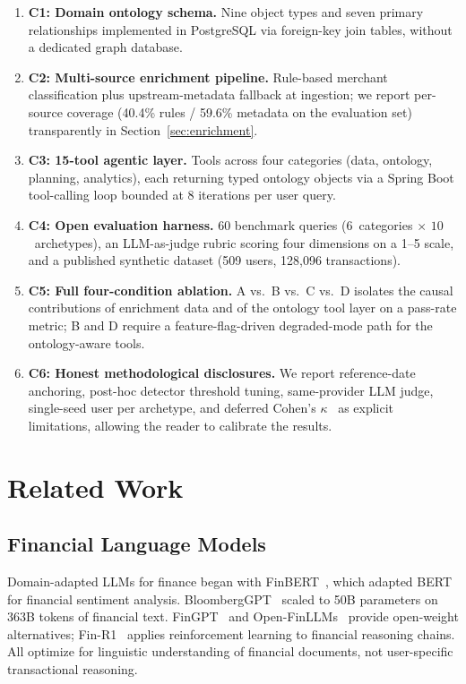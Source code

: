 \documentclass[conference]{IEEEtran}
\begin{document}
\begin{enumerate}
  \item \textbf{C1: Domain ontology schema.} Nine object types and
    seven primary relationships implemented in PostgreSQL via
    foreign-key join tables, without a dedicated graph database.
  \item \textbf{C2: Multi-source enrichment pipeline.} Rule-based
    merchant classification plus upstream-metadata fallback at
    ingestion; we report per-source coverage (40.4\% rules / 59.6\%
    metadata on the evaluation set) transparently in
    Section~\ref{sec:enrichment}.
  \item \textbf{C3: 15-tool agentic layer.} Tools across four
    categories (data, ontology, planning, analytics), each
    returning typed ontology objects via a Spring Boot tool-calling
    loop bounded at 8 iterations per user query.
  \item \textbf{C4: Open evaluation harness.} 60 benchmark queries
    ($6$~categories $\times$ $10$~archetypes), an LLM-as-judge
    rubric scoring four dimensions on a 1--5 scale, and a published
    synthetic dataset (509 users, 128{,}096 transactions).
  \item \textbf{C5: Full four-condition ablation.} A vs.\ B vs.\ C
    vs.\ D isolates the causal contributions of enrichment data and
    of the ontology tool layer on a pass-rate metric; B and D
    require a feature-flag-driven degraded-mode path for the
    ontology-aware tools.
  \item \textbf{C6: Honest methodological disclosures.} We report
    reference-date anchoring, post-hoc detector threshold tuning,
    same-provider LLM judge, single-seed user per archetype, and
    deferred Cohen's $\kappa$~\cite{cohens_kappa} as explicit
    limitations, allowing the reader to calibrate the results.
\end{enumerate}

\section{Related Work}

\subsection{Financial Language Models}

Domain-adapted LLMs for finance began with
FinBERT~\cite{finbert}, which adapted BERT for financial sentiment
analysis. BloombergGPT~\cite{bloomberggpt} scaled to 50B parameters
on 363B tokens of financial text. FinGPT~\cite{fingpt} and
Open-FinLLMs~\cite{open_finllms} provide open-weight alternatives;
Fin-R1~\cite{fin_r1} applies reinforcement learning to financial
reasoning chains. All optimize for linguistic understanding of
financial documents, not user-specific transactional reasoning.
\end{document}
